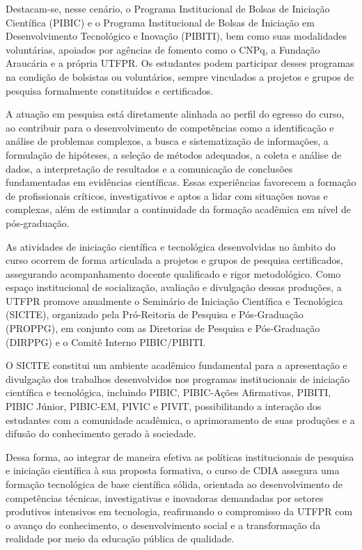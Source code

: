 Destacam-se, nesse cenário, o Programa Institucional de Bolsas de Iniciação Científica (PIBIC) e o Programa Institucional de Bolsas de Iniciação em Desenvolvimento Tecnológico e Inovação (PIBITI), bem como suas modalidades voluntárias, apoiados por agências de fomento como o CNPq, a Fundação Araucária e a própria UTFPR. Os estudantes podem participar desses programas na condição de bolsistas ou voluntários, sempre vinculados a projetos e grupos de pesquisa formalmente constituídos e certificados.

A atuação em pesquisa está diretamente alinhada ao perfil do egresso do curso, ao contribuir para o desenvolvimento de competências como a identificação e análise de problemas complexos, a busca e sistematização de informações, a formulação de hipóteses, a seleção de métodos adequados, a coleta e análise de dados, a interpretação de resultados e a comunicação de conclusões fundamentadas em evidências científicas. Essas experiências favorecem a formação de profissionais críticos, investigativos e aptos a lidar com situações novas e complexas, além de estimular a continuidade da formação acadêmica em nível de pós-graduação.

As atividades de iniciação científica e tecnológica desenvolvidas no âmbito do curso ocorrem de forma articulada a projetos e grupos de pesquisa certificados, assegurando acompanhamento docente qualificado e rigor metodológico. Como espaço institucional de socialização, avaliação e divulgação dessas produções, a UTFPR promove anualmente o Seminário de Iniciação Científica e Tecnológica (SICITE), organizado pela Pró-Reitoria de Pesquisa e Pós-Graduação (PROPPG), em conjunto com as Diretorias de Pesquisa e Pós-Graduação (DIRPPG) e o Comitê Interno PIBIC/PIBITI.

O SICITE constitui um ambiente acadêmico fundamental para a apresentação e divulgação dos trabalhos desenvolvidos nos programas institucionais de iniciação científica e tecnológica, incluindo PIBIC, PIBIC-Ações Afirmativas, PIBITI, PIBIC Júnior, PIBIC-EM, PIVIC e PIVIT, possibilitando a interação dos estudantes com a comunidade acadêmica, o aprimoramento de suas produções e a difusão do conhecimento gerado à sociedade.

Dessa forma, ao integrar de maneira efetiva as políticas institucionais de pesquisa e iniciação científica à sua proposta formativa, o curso de CDIA assegura uma formação tecnológica de base científica sólida, orientada ao desenvolvimento de competências técnicas, investigativas e inovadoras demandadas por setores produtivos intensivos em tecnologia, reafirmando o compromisso da UTFPR com o avanço do conhecimento, o desenvolvimento social e a transformação da realidade por meio da educação pública de qualidade.

